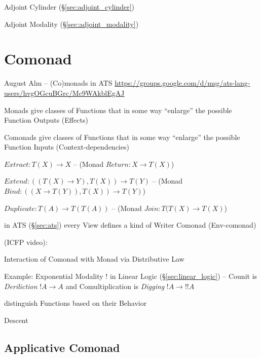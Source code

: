 Adjoint Cylinder (\S\ref{sec:adjoint_cylinder})

Adjoint Modality (\S\ref{sec:adjoint_modality})



\section{Comonad}\label{sec:comonad}

\asterism


August Alm -- (Co)monads in ATS
\url{https://groups.google.com/d/msg/ats-lang-users/hvgOGcuBGrc/Mc9WAkblEgAJ}

Monads give classes of Functions that in some way ``enlarge'' the
possible Function Outputs (Effects)

Comonads give classes of Functions that in some way ``enlarge'' the
possible Function Inputs (Context-dependencies)

$Extract : T(X) \rightarrow X$ -- (Monad $Return : X \rightarrow
T(X)$)

$Extend : ((T(X) \rightarrow Y), T(X)) \rightarrow T(Y)$ -- (Monad
$Bind : ((X \rightarrow T(Y)), T(X)) \rightarrow T(Y)$)

$Duplicate : T(A) \rightarrow T(T(A))$ -- (Monad
$Join : T(T(X) \rightarrow T(X)$)

in ATS (\S\ref{sec:ats}) every View defines a kind of Writer Comonad
(Env-comonad)


\asterism


(ICFP video):

Interaction of Comonad with Monad via Distributive Law %

Example: Exponential Modality $!$ in Linear Logic
(\S\ref{sec:linear_logic}) -- Counit is \emph{Deriliction} $!A
\rightarrow A$ and Comultiplication is \emph{Digging} $!A \rightarrow
!!A$

distinguish Functions based on their Behavior

Descent



\subsection{Applicative Comonad}\label{sec:applicative_comonad}

